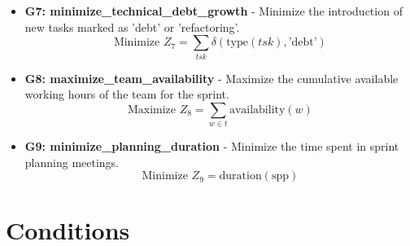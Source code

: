 \documentclass[11pt]{article}
\begin{document}
\begin{itemize}
    \item \textbf{G7: minimize\_technical\_debt\_growth} - Minimize the introduction of new tasks marked as 'debt' or 'refactoring'.
        \[ \text{Minimize } Z_7 = \sum_{tsk} \delta(\text{type}(tsk), \text{'debt'}) \]
    \item \textbf{G8: maximize\_team\_availability} - Maximize the cumulative available working hours of the team for the sprint.
        \[ \text{Maximize } Z_8 = \sum_{w \in t} \text{availability}(w) \]
    \item \textbf{G9: minimize\_planning\_duration} - Minimize the time spent in sprint planning meetings.
        \[ \text{Minimize } Z_9 = \text{duration}(\text{spp}) \]
\end{itemize}

\section{Conditions}
\end{document}
